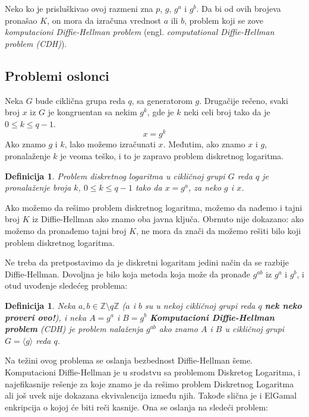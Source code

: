 \documentclass[a4paper]{article}
\newtheorem{defn}[primer]{Definicija}
\begin{document}
{Neko ko je prisluškivao ovoj razmeni zna $p$, $g$, $g^a$ i $g^b$. Da bi od ovih brojeva pronašao $K$, on mora da izračuna vrednost $a$ ili $b$, problem koji se zove \emph{komputacioni Diffie-Hellman problem} (engl. \emph{computational Diffie-Hellman problem (CDH)}). 

\subsection{Problemi oslonci}
\label{subsec:problemi_oslonci}

Neka $G$ bude ciklična grupa reda $q$, sa generatorom $g$. Drugačije rečeno, svaki broj $x$ iz $G$ je 
kongruentan sa nekim $g^k$, gde je $k$ neki celi broj tako da je $0 \leq k \leq q - 1$.
\[x = g^k\]
Ako znamo $g$ i $k$, lako možemo izračunati $x$. Međutim, ako znamo $x$ i $g$, pronalaženje $k$ je veoma teško, 
i to je zapravo problem diskretnog logaritma.

\begin{defn}
Problem diskretnog logaritma u cikličnoj grupi $G$ reda $q$ je pronalaženje broja $k$, $0 \leq k \leq q - 1$ 
tako da $x = g^a$, za neko $g$ i $x$.
\end{defn}

Ako možemo da rešimo problem diskretnog logaritma, možemo da nađemo i tajni broj $K$ iz Diffie-Hellman ako znamo oba javna ključa.
Obrnuto nije dokazano: ako možemo da pronađemo tajni broj $K$, ne mora da znači da možemo rešiti bilo koji problem 
diskretnog logaritma.

Ne treba da pretpostavimo da je diskretni logaritam jedini način da se razbije Diffie-Hellman. 
Dovoljna je bilo koja metoda koja može da pronađe $g^{ab}$ iz $g^a$ i $g^b$, i otud uvođenje sledećeg problema:

\begin{defn}
    Neka $a,b\in \mathbb{Z}\setminus q\mathbb{Z}$ ($a$ i $b$ su u nekoj cikličnoj grupi reda $q$ \textbf{nek neko proveri ovo!}),
    i neka $A = g^a$ i $B = g^b$
    \textbf{Komputacioni Diffie-Hellman problem} (CDH) je problem nalaženja $g^{ab}$ ako znamo $A$ i $B$ u cikličnoj grupi
    $G = \langle g \rangle$ reda $q$.
\end{defn}

Na težini ovog problema se oslanja bezbednost Diffie-Hellman šeme. Komputacioni Diffie-Hellman je u
srodstvu sa problemom Diskretog Logaritma, i najefikasnije rešenje za koje znamo je da rešimo problem Diskretnog Logaritma 
ali još uvek nije dokazana ekvivalencija između njih. \cite{dlproblem}
Takođe slična je i ElGamal enkripcija o kojoj će biti reči kasnije. Ona se oslanja na sledeći problem:

}
\end{document}
